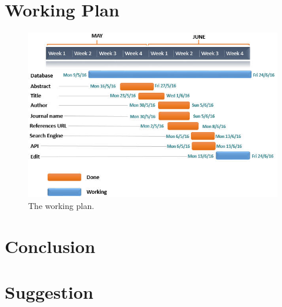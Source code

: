 \section*{Working Plan}

\begin{figure}[tbh]
	\begin{center}
		\includegraphics[width=\columnwidth]{Union_Result_Chart_working plan}
	\end{center}
	\caption{The working plan.}
	\end{figure}
	
\section*{Conclusion}

\section*{Suggestion}